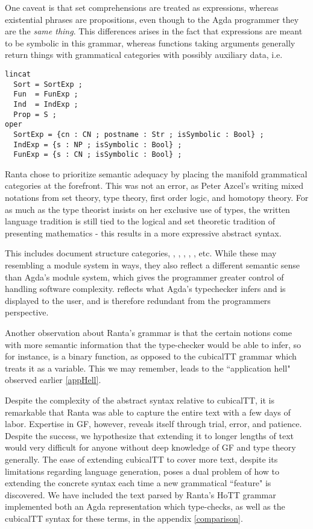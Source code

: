 One caveat is that set comprehensions are treated as expressions, whereas
existential phrases are propositions, even though to the Agda programmer they
are the \emph{same thing}. This differences arises in the fact that expressions
are meant to be symbolic in this grammar, whereas functions taking 
arguments generally return things with grammatical categories with possibly
auxiliary data, i.e.

\begin{verbatim}
lincat
  Sort = SortExp ;
  Fun  = FunExp ;
  Ind  = IndExp ; 
  Prop = S ;
oper
  SortExp = {cn : CN ; postname : Str ; isSymbolic : Bool} ;
  IndExp = {s : NP ; isSymbolic : Bool} ;
  FunExp = {s : CN ; isSymbolic : Bool} ;
\end{verbatim}

Ranta chose to prioritize semantic adequacy by placing the manifold
grammatical categories at the forefront. This was not an error, as Peter Azcel's
writing mixed notations from set theory, type theory, first order logic, and
homotopy theory. For as much as the type theorist insists on her exclusive use
of types, the written language tradition is still tied to the logical and set
theoretic tradition of presenting mathematics - this results in a
more expressive abstract syntax.

This includes document structure categories, , ,
, , , etc. While
these may resembling a module system in ways, they also reflect a different
semantic sense than Agda's module system, which gives the programmer greater
control of handling software complexity.  reflects
what Agda's typechecker infers and is displayed to the user, and is therefore
redundant from the programmers perspective.

Another observation about Ranta's grammar is that the certain notions come with
more semantic information that the type-checker would be able to infer, so for
instance,  is a binary function, as opposed to the cubicalTT
grammar which treats it as a variable. This we may remember, leads to the
``application hell" observed earlier \ref{appHell}.

Despite the complexity of the abstract syntax relative to cubicalTT, it is
remarkable that Ranta was able to capture the entire text with a few days of
labor. Expertise in GF, however, reveals itself through trial, error, and
patience. Despite the success, we hypothesize that extending it to longer
lengths of text would very difficult for anyone without deep knowledge of GF and
type theory generally. The ease of extending cubicalTT to cover more text,
despite its limitations regarding language generation, poses a dual problem of
how to extending the concrete syntax each time a new grammatical ``feature" is
discovered. We have included the text parsed by Ranta's HoTT grammar implemented
both an Agda representation which type-checks, as well as the cubicalTT syntax
for these terms, in the appendix \ref{comparison}.

